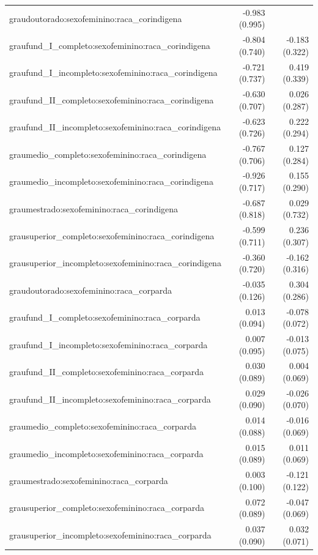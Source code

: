 \documentclass[
  12pt,
  letterpaper,
  DIV=11,
  numbers=noendperiod]{scrartcl}
\begin{document}
\begin{table}[!htbp]
\begin{tabular}{@{\extracolsep{5pt}}lD{.}{.}{-3} D{.}{.}{-3} }
  graudoutorado:sexofeminino:raca\_corindigena & -0.983$ $(0.995) &  \\ 
  graufund\_I\_completo:sexofeminino:raca\_corindigena & -0.804$ $(0.740) & -0.183$ $(0.322) \\ 
  graufund\_I\_incompleto:sexofeminino:raca\_corindigena & -0.721$ $(0.737) & 0.419$ $(0.339) \\ 
  graufund\_II\_completo:sexofeminino:raca\_corindigena & -0.630$ $(0.707) & 0.026$ $(0.287) \\ 
  graufund\_II\_incompleto:sexofeminino:raca\_corindigena & -0.623$ $(0.726) & 0.222$ $(0.294) \\ 
  graumedio\_completo:sexofeminino:raca\_corindigena & -0.767$ $(0.706) & 0.127$ $(0.284) \\ 
  graumedio\_incompleto:sexofeminino:raca\_corindigena & -0.926$ $(0.717) & 0.155$ $(0.290) \\ 
  graumestrado:sexofeminino:raca\_corindigena & -0.687$ $(0.818) & 0.029$ $(0.732) \\ 
  grausuperior\_completo:sexofeminino:raca\_corindigena & -0.599$ $(0.711) & 0.236$ $(0.307) \\ 
  grausuperior\_incompleto:sexofeminino:raca\_corindigena & -0.360$ $(0.720) & -0.162$ $(0.316) \\ 
  graudoutorado:sexofeminino:raca\_corparda & -0.035$ $(0.126) & 0.304$ $(0.286) \\ 
  graufund\_I\_completo:sexofeminino:raca\_corparda & 0.013$ $(0.094) & -0.078$ $(0.072) \\ 
  graufund\_I\_incompleto:sexofeminino:raca\_corparda & 0.007$ $(0.095) & -0.013$ $(0.075) \\ 
  graufund\_II\_completo:sexofeminino:raca\_corparda & 0.030$ $(0.089) & 0.004$ $(0.069) \\ 
  graufund\_II\_incompleto:sexofeminino:raca\_corparda & 0.029$ $(0.090) & -0.026$ $(0.070) \\ 
  graumedio\_completo:sexofeminino:raca\_corparda & 0.014$ $(0.088) & -0.016$ $(0.069) \\ 
  graumedio\_incompleto:sexofeminino:raca\_corparda & 0.015$ $(0.089) & 0.011$ $(0.069) \\ 
  graumestrado:sexofeminino:raca\_corparda & 0.003$ $(0.100) & -0.121$ $(0.122) \\ 
  grausuperior\_completo:sexofeminino:raca\_corparda & 0.072$ $(0.089) & -0.047$ $(0.069) \\ 
  grausuperior\_incompleto:sexofeminino:raca\_corparda & 0.037$ $(0.090) & 0.032$ $(0.071) \\ 

\end{tabular}
\end{table}
\end{document}
